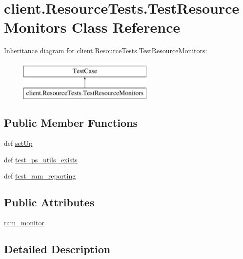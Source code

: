 \hypertarget{classclient_1_1_resource_tests_1_1_test_resource_monitors}{\section{client.\-Resource\-Tests.\-Test\-Resource\-Monitors Class Reference}
\label{classclient_1_1_resource_tests_1_1_test_resource_monitors}
}
Inheritance diagram for client.\-Resource\-Tests.\-Test\-Resource\-Monitors\-:\begin{figure}[H]
\begin{center}
\leavevmode
\includegraphics[height=2.000000cm]{classclient_1_1_resource_tests_1_1_test_resource_monitors}
\end{center}
\end{figure}
\subsection*{Public Member Functions}
\begin{DoxyCompactItemize}
\item 
def \hyperlink{classclient_1_1_resource_tests_1_1_test_resource_monitors_ab39ef38db6a8422245ebb58a0aad1db2}{set\-Up}
\item 
def \hyperlink{classclient_1_1_resource_tests_1_1_test_resource_monitors_ab27fab69129411326058cca6a963e5f6}{test\-\_\-ps\-\_\-utils\-\_\-exists}
\item 
def \hyperlink{classclient_1_1_resource_tests_1_1_test_resource_monitors_a31da9c5ac8a67e38738e14dc4a7e4fe5}{test\-\_\-ram\-\_\-reporting}
\end{DoxyCompactItemize}
\subsection*{Public Attributes}
\begin{DoxyCompactItemize}
\item 
\hyperlink{classclient_1_1_resource_tests_1_1_test_resource_monitors_af0a3e8989c7566318eba78dea04849a4}{ram\-\_\-monitor}
\end{DoxyCompactItemize}


\subsection{Detailed Description}


